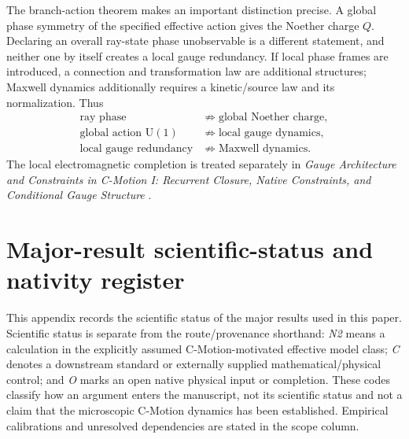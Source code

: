 \documentclass[11pt]{article}
\theoremstyle{definition}
\newcommand{\UU}{\mathrm{U}(1)}
\begin{document}
The branch-action theorem makes an important distinction precise.  A global phase symmetry of
the specified effective action gives the Noether charge $Q$.  Declaring an overall ray-state
phase unobservable is a different statement, and neither one by itself creates a local gauge
redundancy.  If local
phase frames are introduced, a connection and transformation law are additional structures;
Maxwell dynamics additionally requires a kinetic/source law and its normalization.  Thus
\begin{align}
 \text{ray phase}&\not\Rightarrow\text{global Noether charge},\\
 \text{global action }\UU&\not\Rightarrow\text{local gauge dynamics},\\
 \text{local gauge redundancy}&\not\Rightarrow\text{Maxwell dynamics}.
\end{align}
The local electromagnetic completion is treated separately in
\emph{Gauge Architecture and Constraints in C-Motion I: Recurrent Closure,
Native Constraints, and Conditional Gauge Structure}
\cite{CmotionSMStructureI2026}.

\section{Major-result scientific-status and nativity register}
\label{app:status}

This appendix records the scientific status of the major results used in this paper.
Scientific status is separate from the route/provenance shorthand: \emph{N2} means a
calculation in the explicitly assumed C-Motion-motivated effective model class;
\emph{C} denotes a downstream standard or externally supplied mathematical/physical
control; and \emph{O} marks an open native physical input or completion.  These
codes classify how an argument enters the manuscript, not its scientific status
and not a claim that the microscopic C-Motion dynamics has been established.
Empirical calibrations and unresolved dependencies are stated in the scope column.
\end{document}
